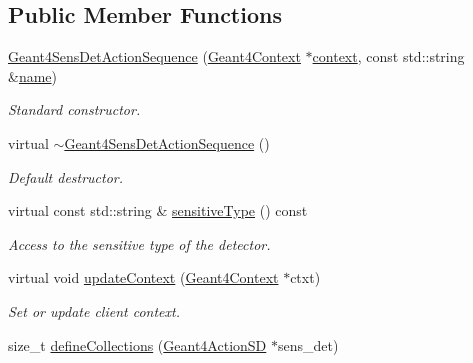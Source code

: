 \subsection*{Public Member Functions}
\begin{DoxyCompactItemize}
\item 
\hyperlink{class_d_d4hep_1_1_simulation_1_1_geant4_sens_det_action_sequence_af8a5bb0d0ca25965a5cc7d6f9b34b469}{Geant4\+Sens\+Det\+Action\+Sequence} (\hyperlink{class_d_d4hep_1_1_simulation_1_1_geant4_context}{Geant4\+Context} $\ast$\hyperlink{class_d_d4hep_1_1_simulation_1_1_geant4_action_aa9d87f0ec2a72b7fc2591b18f98d75cf}{context}, const std\+::string \&\hyperlink{class_d_d4hep_1_1_simulation_1_1_geant4_action_af374e70b014d16afb81dd9d77cc3894b}{name})
\begin{DoxyCompactList}\small\item\em Standard constructor. \end{DoxyCompactList}\item 
virtual \hyperlink{class_d_d4hep_1_1_simulation_1_1_geant4_sens_det_action_sequence_a0e8473bdb136ab4eae734fd3305b4f05}{$\sim$\+Geant4\+Sens\+Det\+Action\+Sequence} ()
\begin{DoxyCompactList}\small\item\em Default destructor. \end{DoxyCompactList}\item 
virtual const std\+::string \& \hyperlink{class_d_d4hep_1_1_simulation_1_1_geant4_sens_det_action_sequence_aeb8f149bcfbe3211ab24178295b16dde}{sensitive\+Type} () const
\begin{DoxyCompactList}\small\item\em Access to the sensitive type of the detector. \end{DoxyCompactList}\item 
virtual void \hyperlink{class_d_d4hep_1_1_simulation_1_1_geant4_sens_det_action_sequence_a5878271f8da03d02bf4b3b8145246775}{update\+Context} (\hyperlink{class_d_d4hep_1_1_simulation_1_1_geant4_context}{Geant4\+Context} $\ast$ctxt)
\begin{DoxyCompactList}\small\item\em Set or update client context. \end{DoxyCompactList}\item 
size\+\_\+t \hyperlink{class_d_d4hep_1_1_simulation_1_1_geant4_sens_det_action_sequence_a6b123f2232b47f787478fd744898ab0e}{define\+Collections} (\hyperlink{class_d_d4hep_1_1_simulation_1_1_geant4_action_s_d}{Geant4\+Action\+SD} $\ast$sens\+\_\+det)

\end{DoxyCompactItemize}
